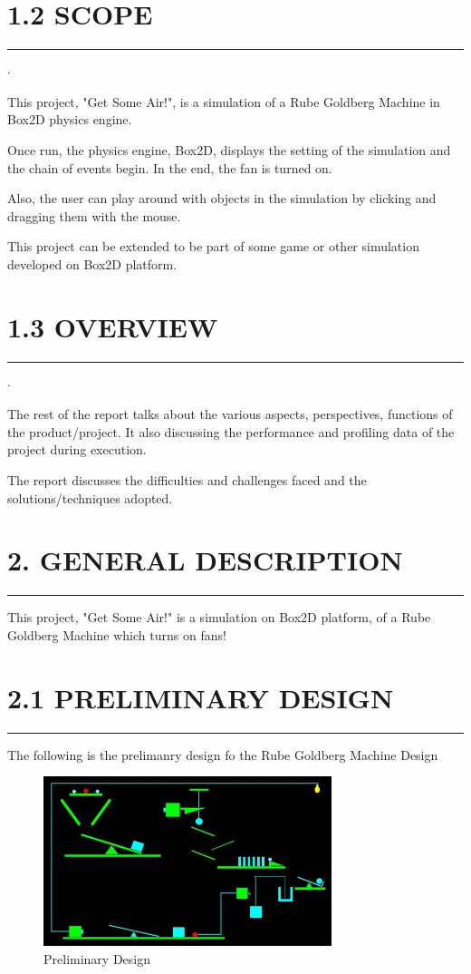 \documentclass{report}
\begin{document}
\section*{1.2 SCOPE}
\hrule
\large
\begin{list}{$\cdot$}{\setlength{\leftmargin}{0em}}
\item This project, "Get Some Air!", is a simulation of a Rube Goldberg Machine in Box2D physics engine.
\item Once run, the physics engine, Box2D, displays the setting of the simulation and the chain of events begin. In the end, the fan is turned on. 
\item Also, the user can play around with objects in the simulation by clicking and dragging them with the mouse.
\item This project can be extended to be part of some game or other simulation developed on Box2D platform. 
\end{list}
\section*{1.3 OVERVIEW}
\hrule
\large
\begin{list}{$\cdot$}{\setlength{\leftmargin}{0em}}
\item The rest of the report talks about the various aspects, perspectives, functions of the product/project. It also discussing the performance and profiling data of the project during execution.
\item The report discusses the difficulties and challenges faced and the solutions/techniques adopted.
\end{list}

\pagebreak
\section*{\huge 2. GENERAL DESCRIPTION}
\hrule
This project, "Get Some Air!" is a simulation on Box2D platform, of a Rube Goldberg Machine which turns on fans!
\section*{2.1 PRELIMINARY DESIGN}
\hrule
\large
The following is the prelimanry design fo the Rube Goldberg Machine Design
\begin{figure}[h]
\centering
\includegraphics[width=0.75\textwidth]{latex/box2d_prelim.jpg}
\caption{Preliminary Design}
\end{figure}
\end{document}
